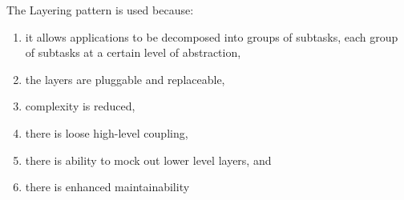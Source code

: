 The Layering pattern is used because:
\begin{enumerate}	
	\item it allows applications to be decomposed into groups of subtasks, each group of subtasks at a certain level of abstraction,
	\item the layers are pluggable and replaceable,
	\item complexity is reduced,
	\item there is loose high-level coupling,
	\item there is ability to mock out lower level layers, and
	\item there is enhanced maintainability
\end{enumerate}